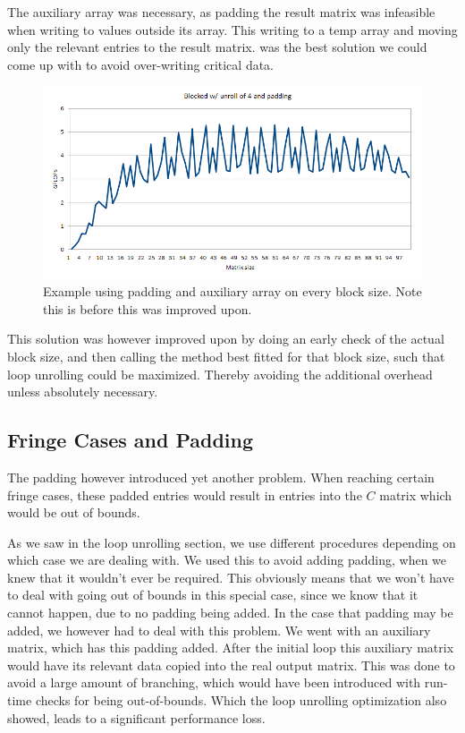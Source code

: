\documentclass[a4paper.11pt,oneside]{book}
\begin{document}
The auxiliary array was necessary, as padding the result matrix was infeasible
when writing to values outside its array. This writing to a temp array and
moving only the relevant entries to the result matrix. was the best solution 
we could come up with to avoid over-writing critical data.

\begin{figure}
  \centering
  \includegraphics[width=0.9\linewidth]{graph-blocked-padding.png}
  \caption{Example using padding and auxiliary array on every block size. Note 
  this is before this was improved upon.}
  \centering
  \label{fig:sub1}
\end{figure}

This solution was however improved upon by doing an early check of the actual block
size, and then calling the method best fitted for that block size, such that
loop unrolling could be maximized. Thereby avoiding the additional overhead unless
absolutely necessary.

\subsection{Fringe Cases and Padding}

The padding however introduced yet another problem. When reaching certain fringe
cases, these padded entries would result in entries into the $C$ matrix which
would be out of bounds.

As we saw in the loop unrolling section, we use different procedures depending
on which case we are dealing with. We used this to avoid adding padding, when we
knew that it wouldn't ever be required. This obviously means that we won't have
to deal with going out of bounds in this special case, since we know that it
cannot happen, due to no padding being added. In the case that padding may be
added, we however had to deal with this problem. We went with an auxiliary
matrix, which has this padding added. After the initial loop this auxiliary
matrix would have its relevant data copied into the real output matrix. This was
done to avoid a large amount of branching, which would have been introduced with
run-time checks for being out-of-bounds. Which the loop unrolling optimization
also showed, leads to a significant performance loss.
\end{document}
